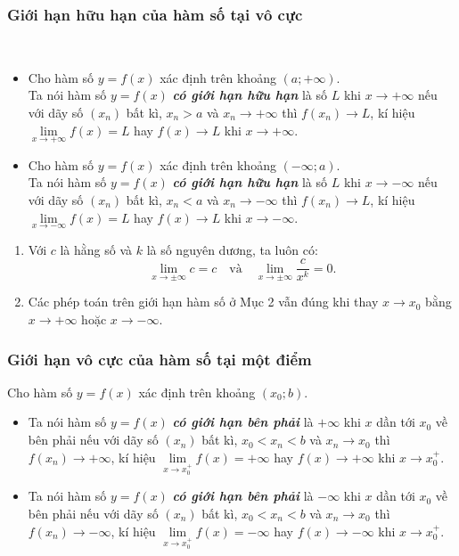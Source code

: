 \begin{tomtat}
	\subsubsection{Giới hạn hữu hạn của hàm số tại vô cực}
	\begin{dn}
		\
		\begin{itemize}
			\item Cho hàm số $ y=f(x) $ xác định trên khoảng $ (a;+\infty) $.\\
			Ta nói hàm số $ y=f(x) $ \textbf{\textit{có giới hạn hữu hạn}} là số $ L $ khi $ x \to +\infty  $ nếu với dãy số $ (x_n) $ bất kì, $ x_n>a $ và $ x_n\to +\infty $ thì $ f(x_n)\to L $, kí hiệu $ \lim \limits_{x \to +\infty} f(x) =L$ hay $ f(x) \to L $ khi $ x\to +\infty $.
			\item Cho hàm số $ y=f(x) $ xác định trên khoảng $ (-\infty;a) $.\\
			Ta nói hàm số $ y=f(x) $ \textbf{\textit{có giới hạn hữu hạn}} là số $ L $ khi $ x \to -\infty $ nếu với dãy số $ (x_n) $ bất kì, $ x_n<a $ và $ x_n\to -\infty $ thì $ f(x_n)\to L $, kí hiệu $ \lim \limits_{x \to -\infty} f(x) =L$ hay $ f(x)\to L $ khi $ x\to -\infty $.
		\end{itemize}
	\end{dn}
	\begin{note}
		\begin{enumerate}
			\item Với $ c $ là hằng số và $ k $ là  số nguyên dương, ta luôn có:
			$$\lim \limits_{x \to \pm \infty} c=c\quad \text{và} \quad \lim \limits_{x \to \pm \infty} \dfrac{c}{x^k}=0.$$
			\item Các phép toán trên giới hạn hàm số ở Mục 2 vẫn đúng khi thay $ x\to x_0 $ bằng $ x\to +\infty $ hoặc $ x\to -\infty $.
		\end{enumerate}
	\end{note}
	
	\subsubsection{Giới hạn vô cực của hàm số tại một điểm}
	
	\begin{dn}
		Cho hàm số $ y=f(x) $ xác định trên khoảng $ (x_0;b) $.
		\begin{itemize}
			\item 
			Ta nói hàm số $ y=f(x) $ \textbf{\textit{có giới hạn bên phải}} là $ +\infty $ khi $ x $ dần tới $ x_0 $ về bên phải nếu với dãy số $ (x_n) $ bất kì, $ x_0<x_n<b $ và $ x_n\to x_0 $ thì $ f(x_n)\to +\infty $, kí hiệu $ \lim \limits_{x \to x_0^+} f(x) =+\infty$ hay $ f(x)\to +\infty $ khi $ x \to x_0^+ $.
			\item Ta nói hàm số $ y=f(x) $ \textbf{\textit{có giới hạn bên phải}} là  $ -\infty $ khi $ x $ dần tới $ x_0 $ về bên phải nếu với dãy số $ (x_n) $ bất kì, $ x_0<x_n<b $ và $ x_n\to x_0 $ thì $ f(x_n)\to -\infty $, kí hiệu $ \lim \limits_{x \to x_0^+} f(x) =-\infty$ hay $ f(x)\to -\infty $ khi $ x\to x_0^+ $.
		\end{itemize}
	\end{dn}
	

\end{tomtat}
